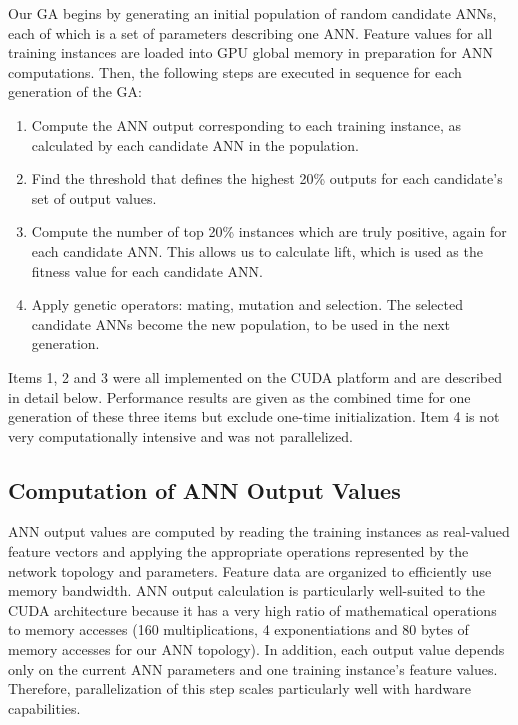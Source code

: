 \documentclass[11pt]{article}       %
\begin{document}
Our GA begins by generating an initial population of random candidate ANNs, each of which is a set of parameters describing one ANN. Feature values for all training instances are loaded into GPU global memory in preparation for ANN computations. Then, the following steps are executed in sequence for each generation of the GA:

\begin{enumerate}
	\item Compute the ANN output corresponding to each training instance, as calculated by each candidate ANN in the population.
	\item Find the threshold that defines the highest 20\% outputs for each candidate's set of output values.
	\item Compute the number of top 20\% instances which are truly positive, again for each candidate ANN. This allows us to calculate lift, which is used as the fitness value for each candidate ANN.
	\item Apply genetic operators: mating, mutation and selection. The selected candidate ANNs become the new population, to be used in the next generation.
\end{enumerate}

Items 1, 2 and 3 were all implemented on the CUDA platform and are described in detail below. Performance results are given as the combined time for one generation of these three items but exclude one-time initialization. Item 4 is not very computationally intensive and was not parallelized. 

\subsection{Computation of ANN Output Values} \label{ANNcomp}
ANN output values are computed by reading the training instances as real-valued feature vectors and applying the appropriate operations represented by the network topology and parameters. Feature data are organized to efficiently use memory bandwidth. ANN output calculation is particularly well-suited to the CUDA architecture because it has a very high ratio of mathematical operations to memory accesses (160 multiplications, 4 exponentiations and 80 bytes of memory accesses for our ANN topology). In addition, each output value depends only on the current ANN parameters and one training instance's feature values. Therefore, parallelization of this step scales particularly well with hardware capabilities.
\end{document}
